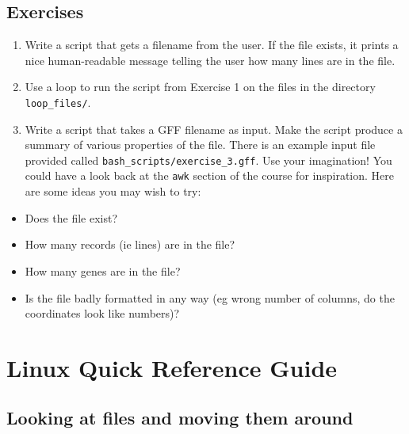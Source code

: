 \documentclass[11pt]{article}
\providecommand{\tightlist}{%
      \setlength{\itemsep}{0pt}\setlength{\parskip}{0pt}}
\begin{document}
    \hypertarget{exercises}{%
\subsection{Exercises}\label{exercises}}

\begin{enumerate}
\def\labelenumi{\arabic{enumi}.}
\tightlist
\item
  Write a script that gets a filename from the user. If the file exists,
  it prints a nice human-readable message telling the user how many
  lines are in the file.
\item
  Use a loop to run the script from Exercise 1 on the files in the
  directory \texttt{loop\_files/}.
\item
  Write a script that takes a GFF filename as input. Make the script
  produce a summary of various properties of the file. There is an
  example input file provided called
  \texttt{bash\_scripts/exercise\_3.gff}. Use your imagination! You
  could have a look back at the \texttt{awk} section of the course for
  inspiration. Here are some ideas you may wish to try:
\end{enumerate}

\begin{itemize}
\tightlist
\item
  Does the file exist?
\item
  How many records (ie lines) are in the file?
\item
  How many genes are in the file?
\item
  Is the file badly formatted in any way (eg wrong number of columns, do
  the coordinates look like numbers)?
\end{itemize}





\newpage





    \hypertarget{linux-quick-reference-guide}{%
\section{Linux Quick Reference
Guide}\label{linux-quick-reference-guide}}

\hypertarget{looking-at-files-and-moving-them-around}{%
\subsection{Looking at files and moving them
around}\label{looking-at-files-and-moving-them-around}}
\end{document}
